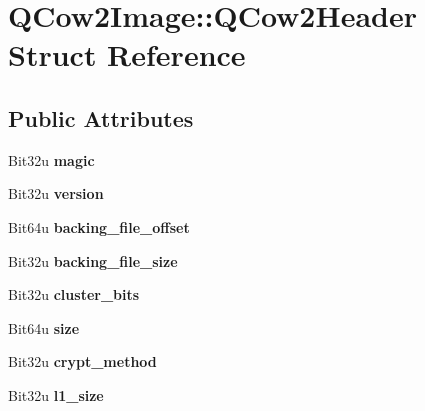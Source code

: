 \hypertarget{structQCow2Image_1_1QCow2Header}{\section{Q\-Cow2\-Image\-:\-:Q\-Cow2\-Header Struct Reference}
\label{structQCow2Image_1_1QCow2Header}
}
\subsection*{Public Attributes}
\begin{DoxyCompactItemize}
\item 
\hypertarget{structQCow2Image_1_1QCow2Header_a61d35e535769d39fa64061fde88620b4}{Bit32u {\bfseries magic}}\label{structQCow2Image_1_1QCow2Header_a61d35e535769d39fa64061fde88620b4}

\item 
\hypertarget{structQCow2Image_1_1QCow2Header_ad8eb08c849013ba96958fc44212ef974}{Bit32u {\bfseries version}}\label{structQCow2Image_1_1QCow2Header_ad8eb08c849013ba96958fc44212ef974}

\item 
\hypertarget{structQCow2Image_1_1QCow2Header_a0b96e7d46f8817cc74047646fd3901ea}{Bit64u {\bfseries backing\-\_\-file\-\_\-offset}}\label{structQCow2Image_1_1QCow2Header_a0b96e7d46f8817cc74047646fd3901ea}

\item 
\hypertarget{structQCow2Image_1_1QCow2Header_aeb07deee33469d0fe3e988a614326d75}{Bit32u {\bfseries backing\-\_\-file\-\_\-size}}\label{structQCow2Image_1_1QCow2Header_aeb07deee33469d0fe3e988a614326d75}

\item 
\hypertarget{structQCow2Image_1_1QCow2Header_a83136a83bba2358640f89048ff21aa76}{Bit32u {\bfseries cluster\-\_\-bits}}\label{structQCow2Image_1_1QCow2Header_a83136a83bba2358640f89048ff21aa76}

\item 
\hypertarget{structQCow2Image_1_1QCow2Header_a9be76c48541ae0fe6f28541e5b285e42}{Bit64u {\bfseries size}}\label{structQCow2Image_1_1QCow2Header_a9be76c48541ae0fe6f28541e5b285e42}

\item 
\hypertarget{structQCow2Image_1_1QCow2Header_a7c7ab92e31413496b36e7958bde0f60c}{Bit32u {\bfseries crypt\-\_\-method}}\label{structQCow2Image_1_1QCow2Header_a7c7ab92e31413496b36e7958bde0f60c}

\item 
\hypertarget{structQCow2Image_1_1QCow2Header_ac96b055f238ef56339f9f71ec2eb9086}{Bit32u {\bfseries l1\-\_\-size}}\label{structQCow2Image_1_1QCow2Header_ac96b055f238ef56339f9f71ec2eb9086}


\end{DoxyCompactItemize}
